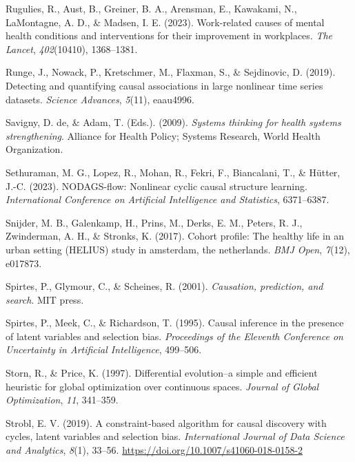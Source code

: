\documentclass[
]{article}
\newlength{\cslhangindent}
\newenvironment{CSLReferences}[2] %
 {\begin{list}{}{%
  \setlength{\itemindent}{0pt}
  \setlength{\leftmargin}{0pt}
  \setlength{\parsep}{0pt}
  \ifodd #1
   \setlength{\leftmargin}{\cslhangindent}
   \setlength{\itemindent}{-1\cslhangindent}
  \fi
  \setlength{\itemsep}{#2\baselineskip}}}
 {\end{list}}
\begin{document}
\begin{CSLReferences}{1}{0}
Rugulies, R., Aust, B., Greiner, B. A., Arensman, E., Kawakami, N.,
LaMontagne, A. D., \& Madsen, I. E. (2023). Work-related causes of
mental health conditions and interventions for their improvement in
workplaces. \emph{The Lancet}, \emph{402}(10410), 1368--1381.

Runge, J., Nowack, P., Kretschmer, M., Flaxman, S., \& Sejdinovic, D.
(2019). Detecting and quantifying causal associations in large nonlinear
time series datasets. \emph{Science Advances}, \emph{5}(11), eaau4996.

Savigny, D. de, \& Adam, T. (Eds.). (2009). \emph{Systems thinking for
health systems strengthening}. Alliance for Health Policy; Systems
Research, World Health Organization.

Sethuraman, M. G., Lopez, R., Mohan, R., Fekri, F., Biancalani, T., \&
Hütter, J.-C. (2023). NODAGS-flow: Nonlinear cyclic causal structure
learning. \emph{International Conference on Artificial Intelligence and
Statistics}, 6371--6387.

Snijder, M. B., Galenkamp, H., Prins, M., Derks, E. M., Peters, R. J.,
Zwinderman, A. H., \& Stronks, K. (2017). Cohort profile: The healthy
life in an urban setting (HELIUS) study in amsterdam, the netherlands.
\emph{BMJ Open}, \emph{7}(12), e017873.

Spirtes, P., Glymour, C., \& Scheines, R. (2001). \emph{Causation,
prediction, and search}. MIT press.

Spirtes, P., Meek, C., \& Richardson, T. (1995). Causal inference in the
presence of latent variables and selection bias. \emph{Proceedings of
the {Eleventh} Conference on {Uncertainty} in Artificial Intelligence},
499--506.

Storn, R., \& Price, K. (1997). Differential evolution--a simple and
efficient heuristic for global optimization over continuous spaces.
\emph{Journal of Global Optimization}, \emph{11}, 341--359.

Strobl, E. V. (2019). A constraint-based algorithm for causal discovery
with cycles, latent variables and selection bias. \emph{International
Journal of Data Science and Analytics}, \emph{8}(1), 33--56.
\url{https://doi.org/10.1007/s41060-018-0158-2}


\end{CSLReferences}
\end{document}
